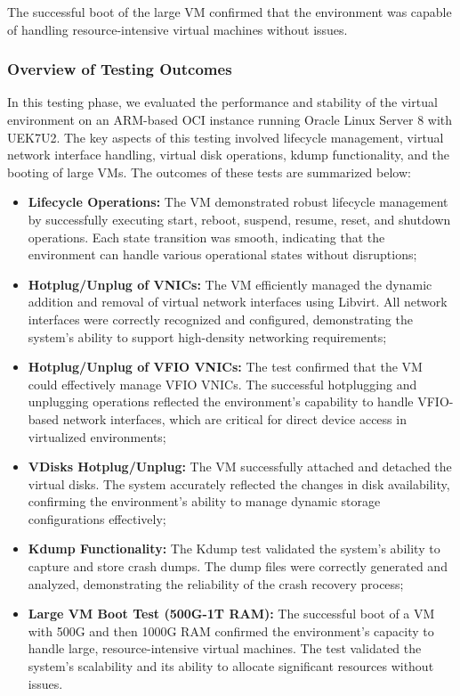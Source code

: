 The successful boot of the large VM confirmed that the environment was capable of handling resource-intensive virtual machines without issues.

\subsubsection[Overview of Testing Outcomes]{Overview of Testing Outcomes}

In this testing phase, we evaluated the performance and stability of the virtual environment on an ARM-based OCI instance running Oracle Linux Server 8 with UEK7U2. The key aspects of this testing involved lifecycle management, virtual network interface handling, virtual disk operations, kdump functionality, and the booting of large VMs. The outcomes of these tests are summarized below:

\begin{itemize}
    \item \textbf{Lifecycle Operations:} The VM demonstrated robust lifecycle management by successfully executing start, reboot, suspend, resume, reset, and shutdown operations. Each state transition was smooth, indicating that the environment can handle various operational states without disruptions;

    \item \textbf{Hotplug/Unplug of VNICs:} The VM efficiently managed the dynamic addition and removal of virtual network interfaces using Libvirt. All network interfaces were correctly recognized and configured, demonstrating the system's ability to support high-density networking requirements;

    \item \textbf{Hotplug/Unplug of VFIO VNICs:} The test confirmed that the VM could effectively manage VFIO VNICs. The successful hotplugging and unplugging operations reflected the environment's capability to handle VFIO-based network interfaces, which are critical for direct device access in virtualized environments;

    \item \textbf{VDisks Hotplug/Unplug:} The VM successfully attached and detached the virtual disks. The system accurately reflected the changes in disk availability, confirming the environment’s ability to manage dynamic storage configurations effectively;

    \item \textbf{Kdump Functionality:} The Kdump test validated the system’s ability to capture and store crash dumps. The dump files were correctly generated and analyzed, demonstrating the reliability of the crash recovery process;

    \item \textbf{Large VM Boot Test (500G-1T RAM):} The successful boot of a VM with 500G and then 1000G RAM confirmed the environment's capacity to handle large, resource-intensive virtual machines. The test validated the system's scalability and its ability to allocate significant resources without issues.
\end{itemize}

